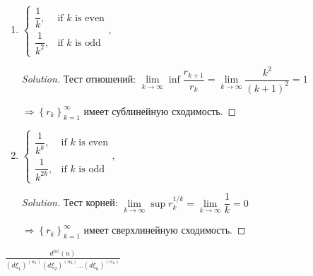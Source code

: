 \documentclass[a4paper,12pt]{article}
\newenvironment{solution}
{\renewcommand\qedsymbol{$\blacksquare$}\begin{proof}[Solution]}{\end{proof}}
\newcommand{\dfr}{\dfrac}
\newcommand{\rw}{\rightarrow}
\newcommand{\iy}{\infty}
\newcommand{\Rw}{\Rightarrow}
\begin{document}
\begin{enumerate}
\begin{solution}
 $\Rw \left\{ r_k\right\}_{k=1}^{\iy}$ имеет сверхлинейную сходимость.
\end{solution}
\item 
$
\begin{cases}
\dfrac{1}{k},& \text{if $k$ is even}\\
\dfrac{1}{k^2},& \text{if $k$ is odd}
\end{cases}, 
$
\begin{solution}
	Тест отношений:
	$\lim\limits_{k \rw \infty}\inf \dfr{r_{k+1}}{r_k} = \lim\limits_{k \rw \infty} \dfr{k^2}{(k+1)^2} = 1$
	
	$\Rw \left\{ r_k\right\}_{k=1}^{\iy}$ имеет сублинейную сходимость.
	
\end{solution}
\item 
$
\begin{cases}
\dfrac{1}{k^k},& \text{if $k$ is even}\\
\dfrac{1}{k^{2k}},& \text{if $k$ is odd}
\end{cases}, 
$
\begin{solution}
Тест корней: 	
$\lim\limits_{k \rw \infty}\sup r_k^{1/k} = \lim\limits_{k \rw \infty}\dfr{1}{k} = 0	$

 $\Rw \left\{ r_k\right\}_{k=1}^{\iy}$ имеет сверхлинейную сходимость.
\end{solution}

\end{enumerate}

$\frac{d^|\alpha|(u)}{(d\xi_1)^(\alpha_1)(d\xi_2)^(\alpha_2)...(d\xi_n)^(\alpha_n)}$
\end{document}
